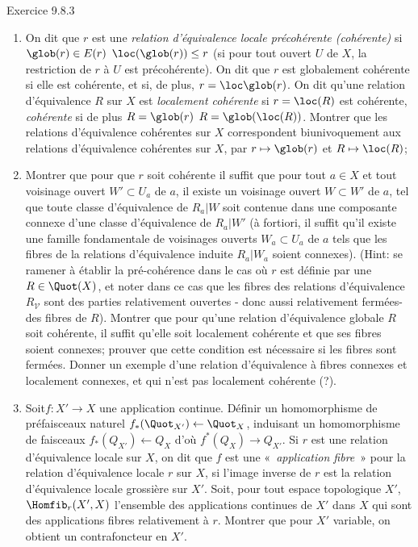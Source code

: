 \begin{enonce*}[remark]{Exercice 9.8.3}
\begin{enumerate}
\item On dit que $r$ est une \emph{relation d'équivalence locale
précohérente (\resp cohérente)} si $\glob(r)\in E(r)$ \ie
$\loc(\glob(r))\leq r$ (\resp si pour tout ouvert $U$ de $X$, la
restriction de $r$ à $U$ est précohérente). On dit que $r$ est
globalement cohérente si elle est cohérente, et si, de plus, $r=\loc
\glob(r)$. On dit qu'une relation d'équivalence $R$ sur $X$ est
\emph{localement cohérente} si $r=\loc(R)$ est cohérente,
\emph{cohérente} si de plus $R=\glob(r)$ \ie $R=\glob(\loc(R))$.
Montrer que les relations d'équivalence 
cohérentes  sur $X$ correspondent biunivoquement aux relations
d'équivalence cohérentes  sur $X$, par $r\mapsto \glob(r)$ et
$R\mapsto \loc(R)$;

\item Montrer que pour que $r$ soit cohérente il suffit que pour tout
$a\in X$ et tout voisinage ouvert $W'\subset U_a$ de $a$, il existe
un voisinage ouvert $W\subset W'$ de $a$, tel que toute classe
d'équivalence de $R_a| W$ soit contenue dans une composante connexe
d'une classe d'équivalence de $R_a| W'$ (à fortiori, il suffit qu'il
existe une famille fondamentale de voisinages ouverts $W_a\subset
U_a$ de $a$ tels que les fibres de la relations d'équivalence
induite $R_a| W_a$ soient connexes). (Hint: se ramener à établir la
pré-cohérence dans le cas où $r$ est définie par une $R\in
\Quot(X)$, et noter dans ce cas que les fibres des relations
d'équivalence $R_{𝒱}$ sont des parties relativement ouvertes
- donc aussi relativement fermées- des fibres de $R$). Montrer que
pour qu'une relation d'équivalence globale $R$ soit cohérente, il
suffit qu'elle soit localement cohérente et que ses fibres soient
connexes; prouver que cette condition est nécessaire si les fibres
sont fermées. Donner un exemple d'une relation d'équivalence à
fibres connexes et localement connexes, et qui n'est pas localement
cohérente (?).

\item Soit\pageoriginale $f:X'\rightarrow X$ une application
continue. Définir un homomorphisme de préfaisceaux naturel
$f_{\ast}(\Quot_{X'})\leftarrow \Quot_{X}$, induisant un
homomorphisme de faisceaux $f_{\ast}(Q_{X'})\leftarrow Q_X$ d'où
$f^{\ast}(Q_X)\rightarrow Q_{X'}$. Si $r$ est une relation
d'équivalence locale sur $X$, on dit que $f$ est une « \emph{application fibre} »  pour la relation d'équivalence locale
$r$ sur $X$, si l'image inverse de $r$ est la relation d'équivalence
locale grossière sur $X'$. Soit, pour tout espace topologique $X'$,
$\Homfib_r(X',X)$ l'ensemble des applications continues de $X'$ dans
$X$ qui sont des applications fibres relativement à $r$. Montrer que
pour $X'$ variable, on obtient un contrafoncteur en $X'$.


\end{enumerate}
\end{enonce*}

